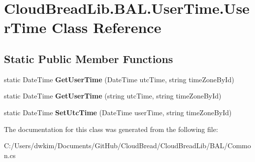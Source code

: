 \hypertarget{a00189}{}\section{Cloud\+Bread\+Lib.\+B\+A\+L.\+User\+Time.\+User\+Time Class Reference}
\label{a00189}
\subsection*{Static Public Member Functions}
\begin{DoxyCompactItemize}
\item 
static Date\+Time {\bfseries Get\+User\+Time} (Date\+Time utc\+Time, string time\+Zone\+By\+Id)\hypertarget{a00189_a6006f411b78e71aa7913cb0e4c209394}{}\label{a00189_a6006f411b78e71aa7913cb0e4c209394}

\item 
static Date\+Time {\bfseries Get\+User\+Time} (string utc\+Time, string time\+Zone\+By\+Id)\hypertarget{a00189_aefb05ddf31260b7f632f1f33c1125287}{}\label{a00189_aefb05ddf31260b7f632f1f33c1125287}

\item 
static Date\+Time {\bfseries Set\+Utc\+Time} (Date\+Time user\+Time, string time\+Zone\+By\+Id)\hypertarget{a00189_a6859b59a97eb28180aa6cb6babfc08b5}{}\label{a00189_a6859b59a97eb28180aa6cb6babfc08b5}

\end{DoxyCompactItemize}


The documentation for this class was generated from the following file\+:\begin{DoxyCompactItemize}
\item 
C\+:/\+Users/dwkim/\+Documents/\+Git\+Hub/\+Cloud\+Bread/\+Cloud\+Bread\+Lib/\+B\+A\+L/Common.\+cs\end{DoxyCompactItemize}
